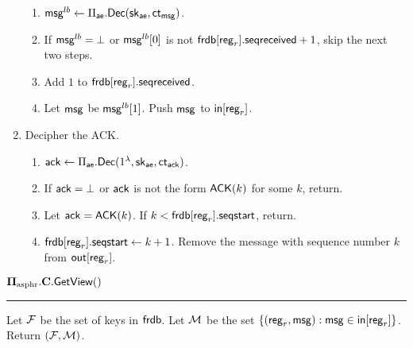 \begin{definition}
\begin{enumerate}
    \begin{enumerate}
        \item $\mathsf{msg}^{lb} \leftarrow \Pi_{\mathsf{ae}}.\mathsf{Dec}({\mathsf{sk}}_{\mathsf{ae}}, \mathsf{ct}_{\mathsf{msg}})$.
        \item If $\mathsf{msg}^{lb} = \bot$ or $\mathsf{msg}^{lb}[0]$ is not $\mathsf{frdb}[\mathsf{reg}_r].\mathsf{seqreceived} + 1$, skip the next two steps.
        \item Add $1$ to $\mathsf{frdb}[\mathsf{reg}_r].\mathsf{seqreceived}$. 
        \item Let $\mathsf{msg}$ be $\mathsf{msg}^{lb}[1]$. Push $\mathsf{msg}$ to $\mathsf{in}[\mathsf{reg}_r]$.
    \end{enumerate}
    \item Decipher the ACK.
    \begin{enumerate}
        \item $\mathsf{ack} \leftarrow \Pi_{\mathsf{ae}}.\mathsf{Dec}(1^{\lambda}, {\mathsf{sk}}_{\mathsf{ae}}, \mathsf{ct}_{\mathsf{ack}})$.
        \item If $\mathsf{ack} = \bot$ or $\mathsf{ack}$ is not the form $\mathsf{ACK}(k)$ for some $k$, return.
        \item Let $\mathsf{ack} = \mathsf{ACK}(k)$. If $k < \mathsf{frdb}[\mathsf{reg}_r].\mathsf{seqstart}$, return.
        \item $\mathsf{frdb}[\mathsf{reg}_r].\mathsf{seqstart} \leftarrow k + 1$. Remove the message with sequence number $k$ from $\mathsf{out}[\mathsf{reg}_r]$.
    \end{enumerate}
\end{enumerate}
\vspace{10pt}
$\mathbf{\Pi_{\text{asphr}}.C.\mathsf{GetView}}()$
\vspace{5pt}
\hrule
\vspace{5pt}
Let $\mathcal{F}$ be the set of keys in $\mathsf{frdb}$. Let $\mathcal{M}$ be the set $\{(\mathsf{reg}_r, \mathsf{msg}): \mathsf{msg} \in \mathsf{in}[\mathsf{reg}_r]\}$. Return $(\mathcal{F}, \mathcal{M})$.

\end{definition}